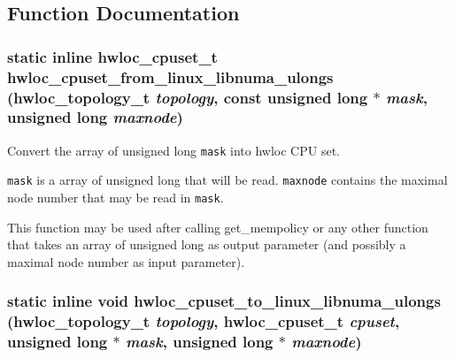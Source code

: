 \subsection{Function Documentation}
\hypertarget{group__hwlocality__linux__libnuma__ulongs_gad80d59fee26a1e0ecf7a0bae76dc685}{
\subsubsection[{hwloc\_\-cpuset\_\-from\_\-linux\_\-libnuma\_\-ulongs}]{\setlength{\rightskip}{0pt plus 5cm}static inline {\bf hwloc\_\-cpuset\_\-t} hwloc\_\-cpuset\_\-from\_\-linux\_\-libnuma\_\-ulongs ({\bf hwloc\_\-topology\_\-t} {\em topology}, \/  const unsigned long $\ast$ {\em mask}, \/  unsigned long {\em maxnode})}}
\label{group__hwlocality__linux__libnuma__ulongs_gad80d59fee26a1e0ecf7a0bae76dc685}


Convert the array of unsigned long {\tt mask} into hwloc CPU set. 

{\tt mask} is a array of unsigned long that will be read. {\tt maxnode} contains the maximal node number that may be read in {\tt mask}.

This function may be used after calling get\_\-mempolicy or any other function that takes an array of unsigned long as output parameter (and possibly a maximal node number as input parameter). \hypertarget{group__hwlocality__linux__libnuma__ulongs_g7119f03aa7437b027edea3a32ebce265}{
\subsubsection[{hwloc\_\-cpuset\_\-to\_\-linux\_\-libnuma\_\-ulongs}]{\setlength{\rightskip}{0pt plus 5cm}static inline void hwloc\_\-cpuset\_\-to\_\-linux\_\-libnuma\_\-ulongs ({\bf hwloc\_\-topology\_\-t} {\em topology}, \/  {\bf hwloc\_\-cpuset\_\-t} {\em cpuset}, \/  unsigned long $\ast$ {\em mask}, \/  unsigned long $\ast$ {\em maxnode})}}
\label{group__hwlocality__linux__libnuma__ulongs_g7119f03aa7437b027edea3a32ebce265}


